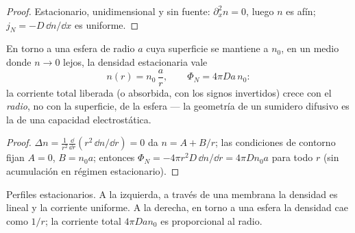 \begin{proof}
Estacionario, unidimensional y sin fuente: $\partial_x^2 n = 0$, luego $n$ es
afín; $j_N = -D\,\dd n/\dd x$ es uniforme.
\end{proof}

\begin{proposition}\label{prop:b2:particle-diffusion:sphere}
En torno a una esfera de radio $a$ cuya superficie se mantiene a $n_0$, en un
medio donde $n \to 0$ lejos, la densidad estacionaria vale
\[
n(r) = n_0\,\frac{a}{r}, \qquad
\Phi_N = 4\pi D a\,n_0 :
\]
la corriente total liberada (o absorbida, con los signos invertidos) crece
con el \emph{radio}, no con la superficie, de la esfera --- la
geometría de un sumidero difusivo es la de una capacidad electrostática.
\end{proposition}

\begin{proof}
$\Delta n = \frac{1}{r^2}\frac{\dd}{\dd r}(r^2\,\dd n/\dd r) = 0$ da
$n = A + B/r$; las condiciones de contorno fijan $A = 0$, $B = n_0 a$; entonces
$\Phi_N = -4\pi r^2 D\,\dd n/\dd r = 4\pi D n_0 a$ para todo $r$ (sin
acumulación en régimen estacionario).
\end{proof}

\begin{omfigure}

{\small Perfiles estacionarios. A la izquierda, a través de una membrana la densidad es
lineal y la corriente uniforme. A la derecha, en torno a una esfera la densidad
cae como $1/r$; la corriente total $4\pi D a n_0$ es proporcional al
radio.}
\end{omfigure}

